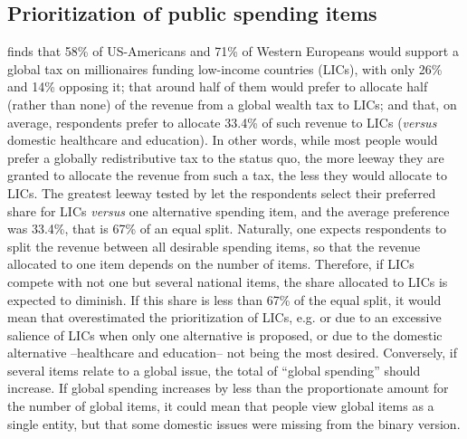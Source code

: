 \documentclass[12pt,english]{article}
\begin{document}
\begin{bibunit}
\subsection{Prioritization of public spending items}\label{subsec:revenue_split}

\cite{fabre_majority_2025} finds that 58\% of US-Americans and 71\% of Western Europeans would support a global tax on millionaires funding low-income countries (LICs), with only 26\% and 14\% opposing it; that around half of them would prefer to allocate half (rather than none) of the revenue from a global wealth tax to LICs; and that, on average, respondents prefer to allocate 33.4\% of such revenue to LICs (\textit{versus} domestic healthcare and education). 
In other words, while most people would prefer a globally redistributive tax to the status quo, the more leeway they are granted to allocate the revenue from such a tax, the less they would allocate to LICs. The greatest leeway tested by \cite{fabre_majority_2025} let the respondents select their preferred share for LICs \textit{versus} one alternative spending item, and the average preference was 33.4\%, that is 67\% of an equal split. %
Naturally, one expects respondents to split the revenue between all desirable spending items, so that the revenue allocated to one item depends on the number of items. Therefore, if LICs compete with not one but several national items, the share allocated to LICs is expected to diminish. If this share is less than 67\% of the equal split, it would mean that \citep{fabre_majority_2025} overestimated the prioritization of LICs, e.g. or due to an excessive salience of LICs when only one alternative is proposed, or due to the domestic alternative --healthcare and education-- not being the most desired. Conversely, if several items relate to a global issue, the total of ``global spending'' should increase. If global spending increases by less than the proportionate amount for the number of global items, it could mean that people view global items as a single entity, but that some domestic issues were missing from the binary version.


\end{bibunit}
\end{document}
